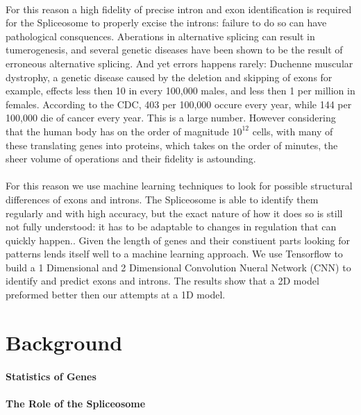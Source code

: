 \documentclass[12pt]{article}
\begin{document}
\paragraph*{}
For this reason a high fidelity of precise intron and exon identification is required for the Spliceosome to properly excise the introns: failure to do so can have pathological consquences. Aberations in alternative splicing can result in tumerogenesis\cite{zhang2021alternative}, and several genetic diseases have been shown to be the result of erroneous alternative splicing\cite{scotti2016rna}.
And yet errors happens rarely: Duchenne muscular dystrophy, a genetic disease caused by the deletion and skipping of exons for example, effects less then 10 in every 100,000 males, and less then 1 per million in females\cite{duan2021duchenne}.
According to the CDC, 403 per 100,000 occure every year, while 144 per 100,000 die of cancer every year.
This is a large number. However considering that the human body has on the order of magnitude $10^{12}$ cells, with many of these translating genes into proteins, which takes on the order of minutes, the sheer volume of operations and their fidelity is astounding.
\paragraph*{}
For this reason we use machine learning techniques to look for possible structural differences of exons and introns.
The Spliceosome is able to identify them regularly and with high accuracy, but the exact nature of how it does so is still not fully understood: it has to be adaptable to changes in regulation that can quickly happen.\cite{wahl2009spliceosome}\cite{will2011spliceosome}.
Given the length of genes and their constiuent parts looking for patterns lends itself well to a machine learning approach.
We use Tensorflow to build a 1 Dimensional and 2 Dimensional Convolution Nueral Network (CNN) to identify and predict exons and introns.
The results show that a 2D model preformed better then our attempts at a 1D model.
\section{Background}
\paragraph*{Statistics of Genes}

\paragraph*{The Role of the Spliceosome}
\end{document}
